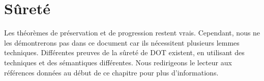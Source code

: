 
\section{Sûreté}

Les théorèmes de préservation et de progression
restent vrais. Cependant, nous ne les démontrerons pas dans ce document car ils
nécessitent plusieurs lemmes techniques. Différentes preuves de la sûreté de DOT
existent, en utilisant des techniques et des sémantiques différentes. Nous
redirigeons le lecteur aux références données au début de ce chapitre pour plus d'informations.
